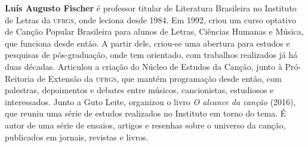 \textbf{Luís Augusto Fischer} é professor titular de Literatura Brasileira no Instituto de Letras da \textsc{ufrgs}, onde leciona desde 1984. Em 1992, criou um curso optativo de Canção Popular Brasileira para alunos de Letras, Ciências Humanas e Música, que funciona desde então. A partir dele, criou-se uma abertura para estudos e pesquisas de pós-graduação, onde tem orientado, com trabalhos realizados já há duas décadas. Articulou a criação do Núcleo de Estudos da Canção, junto à Pró-Reitoria de Extensão da \textsc{ufrgs}, que mantém programação desde então, com palestras, depoimentos e debates entre músicos, cancionistas, estudiosos e interessados. Junto a Guto Leite, organizou o livro \textit{O alcance da canção} (2016), que reuniu uma série de estudos realizados no Instituto em torno do tema. É autor de uma série de ensaios, artigos e resenhas sobre o universo da canção, publicados em jornais, revistas e livros.


\endgroup
\pagebreak



